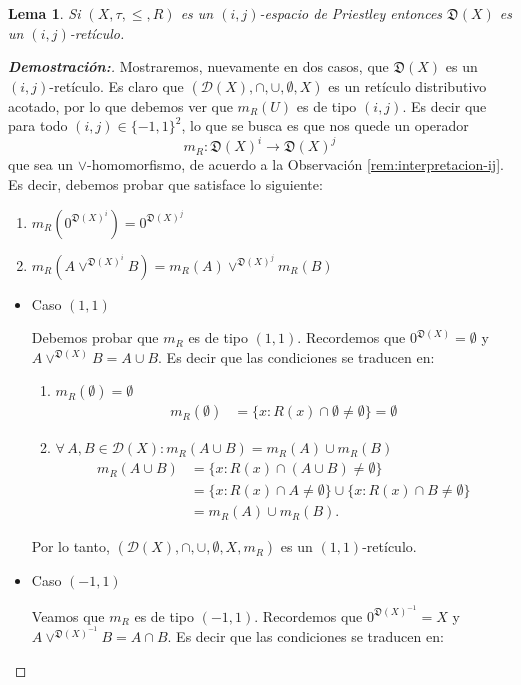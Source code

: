 \documentclass[12pt]{book}
\newtheorem{lemma}[theorem]{Lema}
\newcommand{\D}{\mathfrak{D}}
\begin{document}
\begin{lemma}\label{Lema de Reconstrucción} Si $(X, \tau, \leq, R)$ es un $(i,j)$-espacio de Priestley entonces $\D(X)$ es un $(i,j)$-retículo.
\end{lemma}
\begin{proof}[{\textbf{Demostración:}}]Mostraremos, nuevamente en dos casos, que $\D(X)$ es un $(i,j)$-retículo. Es claro que $\left(\mathcal{D}(X),\cap,\cup,\emptyset,X\right)$ es un retículo distributivo acotado, por lo que debemos ver que $m_{R}(U)$ es de tipo $(i,j)$. Es decir que para todo $(i,j)\in \{-1,1\}^2$, lo que se busca es que nos quede un operador 
    \[m_R:\D(X)^i\to \D(X)^j\]
que sea un $\vee$-homomorfismo, de acuerdo a la Observación \ref{rem:interpretacion-ij}. Es decir, debemos probar que satisface lo siguiente:
    \begin{enumerate}
     \item $m_R\left(0^{\D(X)^{i}}\right)=0^{\D(X)^j}$
     \item $m_R(A\vee^{\D(X)^{i}}B)=m_R(A)\vee^{\D(X)^{j}}m_R(B)$ 
    \end{enumerate} 
\begin{itemize}
    \item Caso $(1,1)$

Debemos probar que $m_R$ es de tipo $(1,1)$. Recordemos que $0^{\D(X)}=\emptyset$ y $A\vee^{\D(X)}B=A\cup B$. Es decir que las condiciones se traducen en:
\begin{enumerate}
  \item $m_R(\emptyset) = \emptyset$
    \begin{align*}
    m_R(\emptyset) &= \{x : R(x) \cap \emptyset \neq \emptyset\} = \emptyset
    \end{align*}
  \item $\forall\, A,B \in \mathcal{D}(X): m_R(A \cup B) = m_R(A) \cup m_R(B)$
    \begin{align*}
    m_R(A \cup B) &= \{x : R(x) \cap (A \cup B) \neq \emptyset\} \\
    &= \{x : R(x) \cap A \neq \emptyset\} \cup \{x : R(x) \cap B \neq \emptyset\} \\
    &= m_R(A) \cup m_R(B).
    \end{align*}
\end{enumerate}
Por lo tanto, $(\mathcal{D}(X), \cap, \cup, \emptyset, X, m_R)$ es un $(1,1)$-retículo.

\item Caso $(-1,1)$

Veamos que $m_R$ es de tipo $(-1,1)$. Recordemos que $0^{\D(X)^{-1}}=X$ y $A\vee^{\D(X)^{-1}}B=A\cap B$. Es decir que las condiciones se traducen en:


\end{itemize}
\end{proof}
\end{document}
